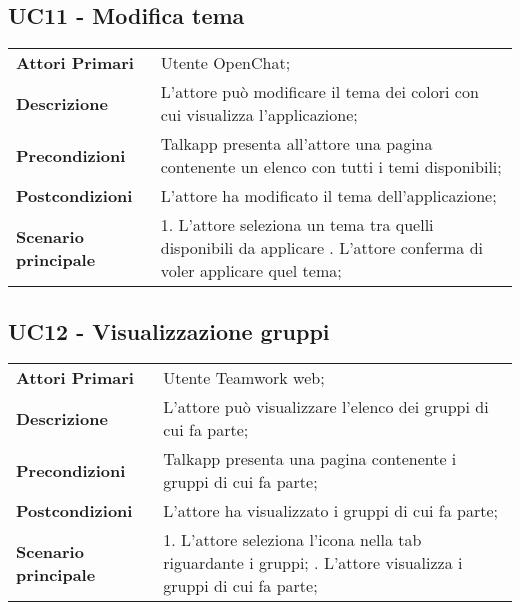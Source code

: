 \subsection{UC11 - Modifica tema}
	\begin{center}
	\bgroup
	\def\arraystretch{1.8}     
	\begin{longtable}{  p{4cm} | p{9.5cm} } 
		\textbf{Attori Primari} & Utente OpenChat; \\ 
		\textbf{Descrizione} &  L'attore può modificare il tema dei colori con cui visualizza l'applicazione; \\ 
		\textbf{Precondizioni}  & Talkapp presenta all'attore una pagina contenente un elenco con tutti i temi disponibili; \\
		\textbf{Postcondizioni} & L'attore ha modificato il tema dell'applicazione; \\ 
		\textbf{Scenario principale} & 
		1. L'attore seleziona un tema tra quelli disponibili da applicare \newline
		2. L'attore conferma di voler applicare quel tema;
	\end{longtable}
	\egroup
\end{center}

\subsection{UC12 - Visualizzazione gruppi}
	\begin{center}
	\bgroup
	\def\arraystretch{1.8}     
	\begin{longtable}{  p{4cm} | p{9.5cm} } 
		\textbf{Attori Primari} & Utente Teamwork web; \\ 
		\textbf{Descrizione} &  L'attore può visualizzare l'elenco dei gruppi di cui fa parte; \\ 
		\textbf{Precondizioni}  & Talkapp presenta una pagina contenente i gruppi di cui fa parte; \\
		\textbf{Postcondizioni} & L'attore ha visualizzato i gruppi di cui fa parte; \\ 
		\textbf{Scenario principale} & 
		1. L'attore seleziona l'icona nella tab riguardante i gruppi; \newline
		2. L'attore visualizza i gruppi di cui fa parte;
	\end{longtable}
	\egroup
\end{center}

